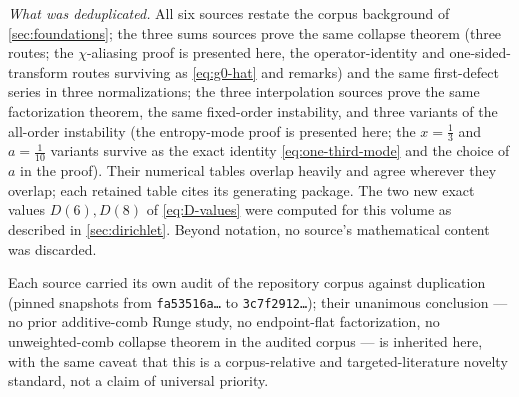 \documentclass[11pt,oneside]{article}
\numberwithin{equation}{section}
\theoremstyle{definition}
\theoremstyle{remark}
\begin{document}
\emph{What was deduplicated.}  All six sources restate the corpus
background of \cref{sec:foundations}; the three sums sources prove
the same collapse theorem (three routes; the $\chi$-aliasing proof is
presented here, the operator-identity and one-sided-transform routes
surviving as \eqref{eq:g0-hat} and remarks) and the same first-defect
series in three normalizations; the three interpolation sources prove
the same factorization theorem, the same fixed-order instability, and
three variants of the all-order instability (the entropy-mode proof
is presented here; the $x=\tfrac13$ and $a=\tfrac1{10}$ variants
survive as the exact identity \eqref{eq:one-third-mode} and the
choice of $a$ in the proof).  Their numerical tables overlap heavily
and agree wherever they overlap; each retained table cites its
generating package.  The two new exact values $D(6),D(8)$ of
\eqref{eq:D-values} were computed for this volume as described in
\cref{sec:dirichlet}.  Beyond notation, no source's mathematical
content was discarded.

Each source carried its own audit of the repository corpus against
duplication (pinned snapshots from
\texttt{fa53516a\ldots} to \texttt{3c7f2912\ldots}); their unanimous
conclusion --- no prior additive-comb Runge study, no endpoint-flat
factorization, no unweighted-comb collapse theorem in the audited
corpus --- is inherited here, with the same caveat that this is a
corpus-relative and targeted-literature novelty standard, not a claim
of universal priority.
\end{document}
